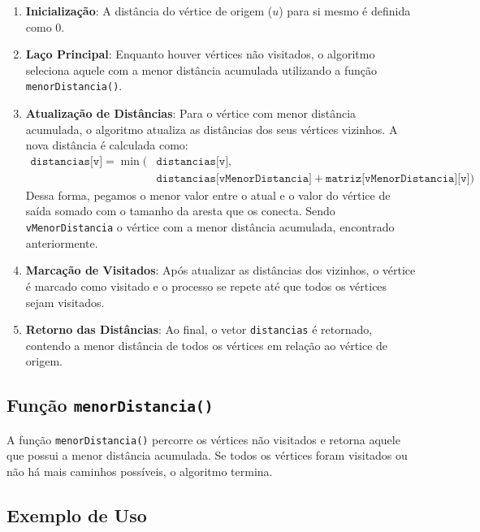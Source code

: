 \documentclass[12pt]{article}
\begin{document}
\begin{enumerate}
    \item \textbf{Inicialização}: A distância do vértice de origem (\(u\)) para si mesmo é definida como 0.
    
    \item \textbf{Laço Principal}: Enquanto houver vértices não visitados, o algoritmo seleciona aquele com a menor distância acumulada utilizando a função \texttt{menorDistancia()}.
    
    \item \textbf{Atualização de Distâncias}: Para o vértice com menor distância acumulada, o algoritmo atualiza as distâncias dos seus vértices vizinhos. A nova distância é calculada como:
    \begin{align*}
    \texttt{distancias[v]} = \min \big(&\texttt{distancias[v]}, \\
    &\texttt{distancias[vMenorDistancia]} + \texttt{matriz[vMenorDistancia][v]} \big)
\end{align*}
    Dessa forma, pegamos o menor valor entre o atual e o valor do vértice de saída somado com o tamanho da aresta que os conecta.
    Sendo \texttt{vMenorDistancia} o vértice com a menor distância acumulada, encontrado anteriormente.
    
    \item \textbf{Marcação de Visitados}: Após atualizar as distâncias dos vizinhos, o vértice é marcado como visitado e o processo se repete até que todos os vértices sejam visitados.
    
    \item \textbf{Retorno das Distâncias}: Ao final, o vetor \texttt{distancias} é retornado, contendo a menor distância de todos os vértices em relação ao vértice de origem.
\end{enumerate}

\subsection{Função \texttt{menorDistancia()}}

A função \texttt{menorDistancia()} percorre os vértices não visitados e retorna aquele que possui a menor distância acumulada. Se todos os vértices foram visitados ou não há mais caminhos possíveis, o algoritmo termina.

\subsection{Exemplo de Uso}
\end{document}
